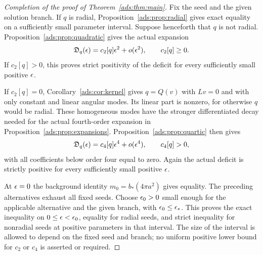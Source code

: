 \begin{proof}[Completion of the proof of Theorem~\ref{ads:thm:main}]
Fix the seed and the given solution branch.  If $q$ is radial,
Proposition~\ref{ads:prop:radial} gives exact equality on a sufficiently
small parameter interval.
Suppose henceforth that $q$ is not radial.
Proposition~\ref{ads:prop:quadratic} gives the actual expansion
\[
 \mathfrak D_q(\epsilon)=c_2[q]\epsilon^2+o(\epsilon^2),
 \qquad c_2[q]\geq0.
\]
If $c_2[q]>0$, this proves strict positivity of the deficit for every
sufficiently small positive $\epsilon$.

If $c_2[q]=0$, Corollary~\ref{ads:cor:kernel} gives
$q=Q(v)$ with $Lv=0$ and with only constant and linear angular modes.
Its linear part is nonzero, for otherwise $q$ would be radial.
These homogeneous modes have the stronger differentiated decay needed
for the actual fourth-order expansion in
Proposition~\ref{ads:prop:expansions}.
Proposition~\ref{ads:prop:quartic} then gives
\[
 \mathfrak D_q(\epsilon)=c_4[q]\epsilon^4+o(\epsilon^4),
 \qquad c_4[q]>0,
\]
with all coefficients below order four equal to zero.
Again the actual deficit is strictly positive for every sufficiently
small positive $\epsilon$.

At $\epsilon=0$ the background identity
$m_0=b_*(4\pi a^2)$ gives equality.
The preceding alternatives exhaust all fixed seeds.  Choose
$\epsilon_0>0$ small enough for the applicable alternative and the given
branch, with $\epsilon_0\leq\epsilon_*$.
This proves the exact inequality on $0\leq\epsilon<\epsilon_0$, equality for
radial seeds, and strict inequality for nonradial seeds at positive
parameters in that interval.
The size of the interval is allowed to depend on the fixed seed and
branch; no uniform positive lower bound for $c_2$ or $c_4$ is asserted
or required.
\end{proof}
